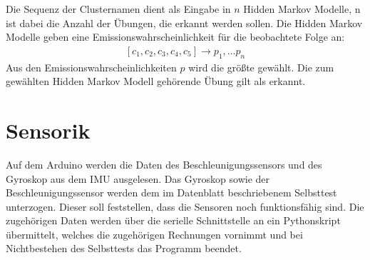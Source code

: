 \documentclass{article}
\begin{document}
Die Sequenz der Clusternamen dient als Eingabe in $n$ Hidden Markov Modelle, n ist dabei die Anzahl der Übungen, die erkannt werden sollen.
Die Hidden Markov Modelle geben eine Emissionswahrscheinlichkeit für die beobachtete Folge an:
\begin{align*}
\left[c_1, c_2, c_3, c_4, c_5\right] \rightarrow p_1, ... p_n
\end{align*}
Aus den Emissionswahrscheinlichkeiten $p$ wird die größte gewählt.
Die zum gewählten Hidden Markov Modell gehörende Übung gilt als erkannt.

\newpage
\section{Sensorik}
\label{sec:sensors}
Auf dem Arduino werden die Daten des Beschleunigungssensors und des Gyroskop aus dem IMU ausgelesen.
Das Gyroskop sowie der Beschleunigungssensor werden dem im Datenblatt beschriebenem Selbsttest unterzogen.
Dieser soll feststellen, dass die Sensoren noch funktionsfähig sind.
Die zugehörigen Daten werden über die serielle Schnittstelle an ein Pythonskript übermittelt, welches die zugehörigen Rechnungen vornimmt und bei Nichtbestehen des Selbsttests das Programm beendet.
\end{document}
